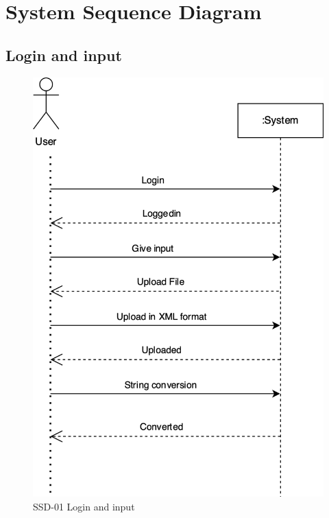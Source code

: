 \documentclass[12pt,a4paper]{article}
\begin{document}
\section{System Sequence Diagram}
\subsection{Login and input}
\begin{figure}[h]
 \centering
\includegraphics[scale=0.30]{Diagram/Login_SSD.png}
\caption{SSD-01 Login and input}
\end{figure}

\newpage
\end{document}
